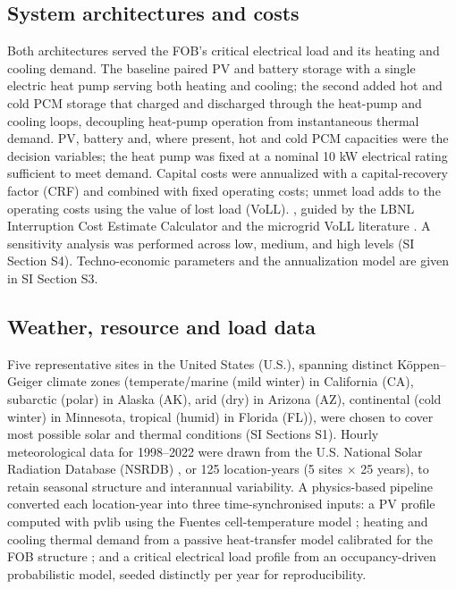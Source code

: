 \documentclass[
  journal=large,
  manuscript=article-type,
  year=2020,
  volume=37,
]{cup-journal}
\begin{document}
\subsection{System architectures and costs}

Both architectures served the FOB's critical electrical load and its heating and cooling demand. The baseline paired PV and battery storage with a single electric heat pump serving both heating and cooling; the second added hot and cold PCM storage that charged and discharged through the heat-pump and cooling loops, decoupling heat-pump operation from instantaneous thermal demand. PV, battery and, where present, hot and cold PCM capacities were the decision variables; the heat pump was fixed at a nominal 10 kW electrical rating sufficient to meet demand. Capital costs were annualized with a capital-recovery factor (CRF) and combined with fixed operating costs; unmet load adds to the operating costs using the value of lost load (VoLL). \parencite{ref39}, guided by the LBNL Interruption Cost Estimate Calculator and the microgrid VoLL literature \parencite{ref40,ref41,ref42,ref43}. A sensitivity analysis was performed across low, medium, and high levels (SI Section S4). Techno-economic parameters and the annualization model are given in SI Section S3.

\subsection{Weather, resource and load data}

Five representative sites in the United States (U.S.), spanning distinct K\"oppen--Geiger climate zones (temperate/marine (mild winter) in California (CA), subarctic (polar) in Alaska (AK), arid (dry) in Arizona (AZ), continental (cold winter) in Minnesota, tropical (humid) in Florida (FL)), were chosen to cover most possible solar and thermal conditions \parencite{ref34} (SI Sections S1). Hourly meteorological data for 1998--2022 were drawn from the U.S. National Solar Radiation Database (NSRDB) \parencite{ref35}, or 125 location-years (5 sites $\times$ 25 years), to retain seasonal structure and interannual variability. A physics-based pipeline converted each location-year into three time-synchronised inputs: a PV profile computed with pvlib using the Fuentes cell-temperature model \parencite{ref36,ref37}; heating and cooling thermal demand from a passive heat-transfer model calibrated for the FOB structure \parencite{ref38}; and a critical electrical load profile from an occupancy-driven probabilistic model, seeded distinctly per year for reproducibility.
\end{document}
